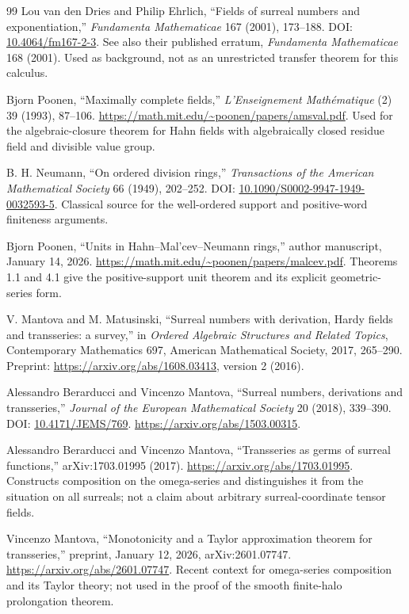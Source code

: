 \documentclass[11pt,letterpaper]{article}
\theoremstyle{definition}
\theoremstyle{remark}
\begin{document}
\begin{thebibliography}{99}
Lou van den Dries and Philip Ehrlich, ``Fields of surreal numbers and
exponentiation,'' \emph{Fundamenta Mathematicae} 167 (2001), 173--188.
DOI: \href{https://doi.org/10.4064/fm167-2-3}{10.4064/fm167-2-3}.
See also their published erratum, \emph{Fundamenta Mathematicae} 168 (2001).
Used as background, not as an unrestricted transfer theorem for this calculus.

Bjorn Poonen, ``Maximally complete fields,'' \emph{L'Enseignement
Math\'ematique} (2) 39 (1993), 87--106.
\url{https://math.mit.edu/~poonen/papers/amsval.pdf}.
Used for the algebraic-closure theorem for Hahn fields with algebraically
closed residue field and divisible value group.

B. H. Neumann, ``On ordered division rings,'' \emph{Transactions of the
American Mathematical Society} 66 (1949), 202--252.
DOI: \href{https://doi.org/10.1090/S0002-9947-1949-0032593-5}{10.1090/S0002-9947-1949-0032593-5}.
Classical source for the well-ordered support and positive-word finiteness
arguments.

Bjorn Poonen, ``Units in Hahn--Mal'cev--Neumann rings,'' author manuscript,
January 14, 2026.
\url{https://math.mit.edu/~poonen/papers/malcev.pdf}.
Theorems 1.1 and 4.1 give the positive-support unit theorem and its explicit
geometric-series form.

V. Mantova and M. Matusinski, ``Surreal numbers with derivation, Hardy fields
and transseries: a survey,'' in \emph{Ordered Algebraic Structures and Related
Topics}, Contemporary Mathematics 697, American Mathematical Society, 2017,
265--290. Preprint: \url{https://arxiv.org/abs/1608.03413}, version 2 (2016).

Alessandro Berarducci and Vincenzo Mantova, ``Surreal numbers, derivations
and transseries,'' \emph{Journal of the European Mathematical Society} 20
(2018), 339--390. DOI: \href{https://doi.org/10.4171/JEMS/769}{10.4171/JEMS/769}.
\url{https://arxiv.org/abs/1503.00315}.

Alessandro Berarducci and Vincenzo Mantova, ``Transseries as germs of surreal
functions,'' arXiv:1703.01995 (2017).
\url{https://arxiv.org/abs/1703.01995}.
Constructs composition on the omega-series and distinguishes it from the
situation on all surreals; not a claim about arbitrary surreal-coordinate tensor
fields.

Vincenzo Mantova, ``Monotonicity and a Taylor approximation theorem for
transseries,'' preprint, January 12, 2026, arXiv:2601.07747.
\url{https://arxiv.org/abs/2601.07747}.
Recent context for omega-series composition and its Taylor theory; not used
in the proof of the smooth finite-halo prolongation theorem.


\end{thebibliography}
\end{document}
